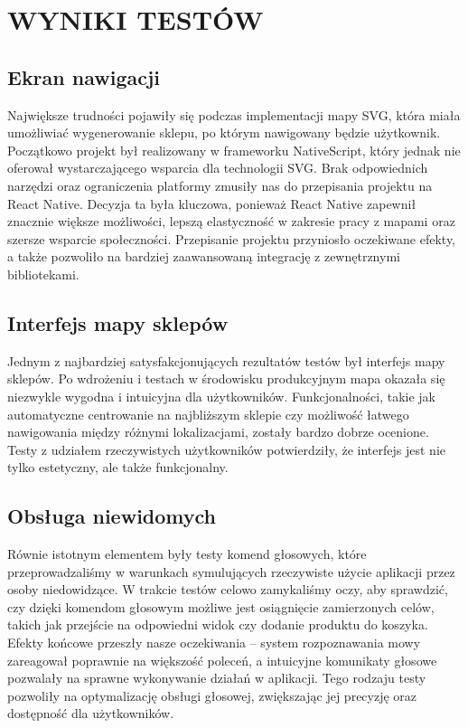 \chapter{WYNIKI TESTÓW}
\label{chapter:wyniki_testow}

\section{Ekran nawigacji} 
Największe trudności pojawiły się podczas implementacji mapy SVG, która miała umożliwiać wygenerowanie sklepu, po którym nawigowany będzie użytkownik. Początkowo projekt był realizowany w frameworku NativeScript, który jednak nie oferował wystarczającego wsparcia dla technologii SVG. Brak odpowiednich narzędzi oraz ograniczenia platformy zmusiły nas do przepisania projektu na React Native. Decyzja ta była kluczowa, ponieważ React Native zapewnił znacznie większe możliwości, lepszą elastyczność w zakresie pracy z mapami oraz szersze wsparcie społeczności. Przepisanie projektu przyniosło oczekiwane efekty, a także pozwoliło na bardziej zaawansowaną integrację z zewnętrznymi bibliotekami.

\section{Interfejs mapy sklepów} 
Jednym z najbardziej satysfakcjonujących rezultatów testów był interfejs mapy sklepów. Po wdrożeniu i testach w środowisku produkcyjnym mapa okazała się niezwykle wygodna i intuicyjna dla użytkowników. Funkcjonalności, takie jak automatyczne centrowanie na najbliższym sklepie czy możliwość łatwego nawigowania między różnymi lokalizacjami, zostały bardzo dobrze ocenione. Testy z udziałem rzeczywistych użytkowników potwierdziły, że interfejs jest nie tylko estetyczny, ale także funkcjonalny.

\section{Obsługa niewidomych} 
Równie istotnym elementem były testy komend głosowych, które przeprowadzaliśmy w warunkach symulujących rzeczywiste użycie aplikacji przez osoby niedowidzące. W trakcie testów celowo zamykaliśmy oczy, aby sprawdzić, czy dzięki komendom głosowym możliwe jest osiągnięcie zamierzonych celów, takich jak przejście na odpowiedni widok czy dodanie produktu do koszyka. Efekty końcowe przeszły nasze oczekiwania – system rozpoznawania mowy zareagował poprawnie na większość poleceń, a intuicyjne komunikaty głosowe pozwalały na sprawne wykonywanie działań w aplikacji. Tego rodzaju testy pozwoliły na optymalizację obsługi głosowej, zwiększając jej precyzję oraz dostępność dla użytkowników.

